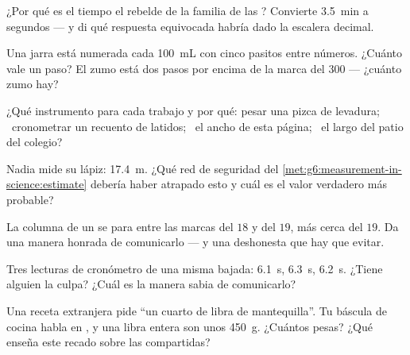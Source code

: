 \begin{exercise}[$\star$]\label{exo:g6:measurement-in-science:3}
¿Por qué es el tiempo el rebelde de la familia de las
? Convierte \qty{3.5}{min} a segundos --- y di qué
respuesta equivocada habría dado la escalera decimal.
\end{exercise}

\begin{exercise}[$\star$]\label{exo:g6:measurement-in-science:4}
Una jarra está numerada cada \qty{100}{mL} con cinco pasitos entre
números. ¿Cuánto vale un paso? El zumo está dos pasos por encima de la
marca del $300$ --- ¿cuánto zumo hay?
\end{exercise}

\begin{exercise}[$\star$]\label{exo:g6:measurement-in-science:5}
¿Qué instrumento para cada trabajo y por qué: pesar una pizca de
levadura; \ cronometrar un recuento de latidos; \ el ancho de esta
página; \ el largo del patio del colegio?
\end{exercise}

\begin{exercise}[$\star$]\label{exo:g6:measurement-in-science:6}
Nadia mide su lápiz: \qty{17.4}{m}. ¿Qué red de seguridad del
\cref{met:g6:measurement-in-science:estimate} debería haber atrapado
esto y cuál es el valor verdadero más probable?
\end{exercise}

\begin{exercise}[$\star$]\label{exo:g6:measurement-in-science:7}
La columna de un  se para entre las marcas del $18$ y del
$19$, más cerca del $19$. Da una manera honrada de comunicarlo --- y
una deshonesta que hay que evitar.
\end{exercise}

\begin{exercise}[$\star$]\label{exo:g6:measurement-in-science:8}
Tres lecturas de cronómetro de una misma bajada: \qty{6.1}{s},
\qty{6.3}{s}, \qty{6.2}{s}. ¿Tiene alguien la culpa? ¿Cuál es la
manera sabia de comunicarlo?
\end{exercise}

\begin{exercise}[$\star\star$]\label{exo:g6:measurement-in-science:9}
Una receta extranjera pide ``un cuarto de libra de mantequilla''. Tu
báscula de cocina habla en , y una libra entera son unos
\qty{450}{g}. ¿Cuántos  pesas? ¿Qué enseña este recado sobre
las  compartidas?
\end{exercise}

